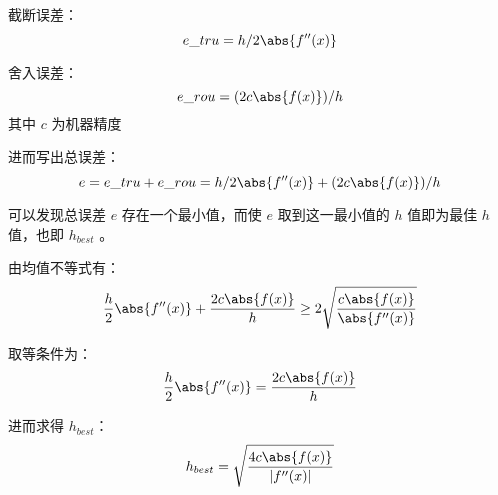 \documentclass[UTF8]{ctexart}
\begin{document}
    截断误差：
    \begin{equation*}
        e\_tru = h / 2 \abs{f''(x)}
    \end{equation*}

    舍入误差：
    \begin{equation*}
        e\_rou = (2c \abs{f(x)}) / h
    \end{equation*}
    其中 \(c\) 为机器精度

    进而写出总误差：
    \begin{equation*}
        e = e\_tru + e\_rou = h / 2 \abs{f''(x)} + (2c \abs{f(x)}) / h
    \end{equation*}

    可以发现总误差 \(e\) 存在一个最小值，而使 \(e\) 取到这一最小值的 \(h\) 值即为最佳 \(h\) 值，也即 \(h_{best}\) 。

    由均值不等式有：
    \begin{equation*}
        \frac{h}{2} \abs{f''(x)} + \frac{2c \abs{f(x)}}{h} \geq 2 \sqrt {\frac{c \abs{f(x)}}{\abs{f''(x)}}}
    \end{equation*}

    取等条件为：
    \begin{equation*}
        \frac{h}{2} \abs{f''(x)} = \frac{2c \abs{f(x)}}{h}
    \end{equation*}

    进而求得 \(h_{best}\)：
    \begin{equation*}
        h_{best} = \sqrt {\frac{4c \abs{f(x)}}{|f''(x)|}}
    \end{equation*}
\end{document}
